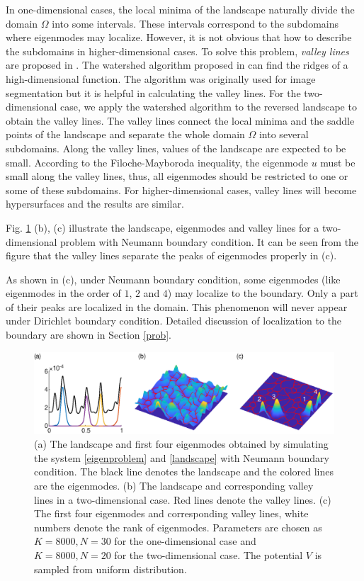 \documentclass[a4paper,11pt]{article}
\begin{document}
In one-dimensional cases, the local minima of the landscape naturally divide the domain $\Omega$ into some intervals. These intervals correspond to the subdomains where eigenmodes may localize. However, it is not obvious that how to describe the subdomains in higher-dimensional cases. To solve this problem, \emph{valley lines} are proposed in \cite{filoche2012universal}. The watershed algorithm proposed in \cite{Soille1990Determining} can find the ridges of a high-dimensional function. The algorithm was originally used for image segmentation but it is helpful in calculating the valley lines. For the two-dimensional case, we apply the watershed algorithm to the reversed landscape to obtain the valley lines. The valley lines connect the local minima and the saddle points of the landscape and separate the whole domain $\Omega$ into several subdomains. Along the valley lines, values of the landscape are expected to be small. According to the Filoche-Mayboroda inequality, the eigenmode $u$ must be small along the valley lines, thus, all eigenmodes should be restricted to one or some of these subdomains. For higher-dimensional cases, valley lines will become hypersurfaces and the results are similar.

Fig. \ref{fig1} (b), (c) illustrate the landscape, eigenmodes and valley lines for a two-dimensional problem with Neumann boundary condition. It can be seen from the figure that the valley lines separate the peaks of eigenmodes properly in (c).

As shown in (c), under Neumann boundary condition, some eigenmodes (like eigenmodes in the order of $1$, $2$ and $4$) may localize to the boundary. Only a part of their peaks are localized in the domain. This phenomenon will never appear under Dirichlet boundary condition. Detailed discussion of localization to the boundary are shown in Section \ref{prob}.

\begin{figure}
\centering
\includegraphics[width=\linewidth]{Fig1.eps}
\caption{(a) The landscape and first four eigenmodes obtained by simulating the system \eqref{eigenproblem} and \eqref{landscape} with Neumann boundary condition. The black line denotes the landscape and the colored lines are the eigenmodes. (b) The landscape and corresponding valley lines in a two-dimensional case. Red lines denote the valley lines. (c) The first four eigenmodes and corresponding valley lines, white numbers denote the rank of eigenmodes. Parameters are chosen as $K = 8000, N = 30$ for the one-dimensional case and $K = 8000, N = 20$ for the two-dimensional case. The potential $V$ is sampled from uniform distribution. }
\label{fig1}
\end{figure}
\end{document}
